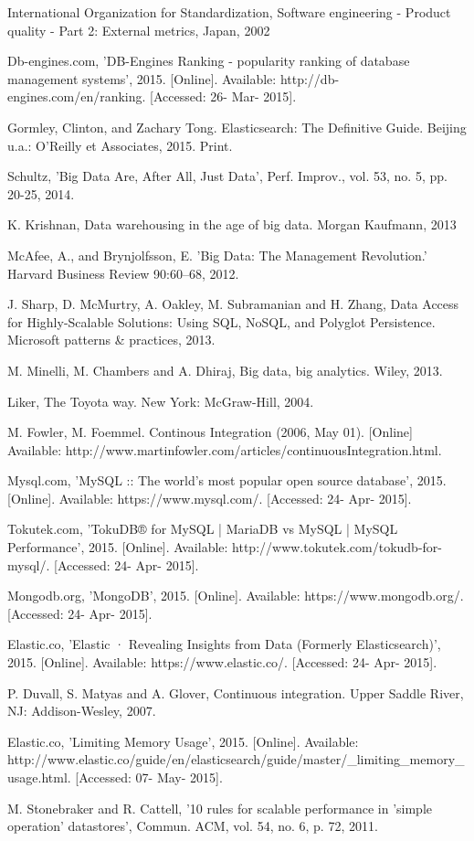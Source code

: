 \begin{thebibliography}{69}
 International Organization for Standardization, Software engineering - Product quality - Part 2: External metrics, Japan, 2002   

 Db-engines.com, 'DB-Engines Ranking - popularity ranking of database management systems', 2015. [Online]. Available: http://db-engines.com/en/ranking. [Accessed: 26- Mar- 2015].

 Gormley, Clinton, and Zachary Tong. Elasticsearch: The Definitive Guide. Beijing u.a.: O'Reilly et Associates, 2015. Print.

 Schultz, 'Big Data Are, After All, Just Data', Perf. Improv., vol. 53, no. 5, pp. 20-25, 2014.

 K. Krishnan, Data warehousing in the age of big data. Morgan Kaufmann, 2013

 McAfee, A., and Brynjolfsson, E. 'Big Data: The Management Revolution.' Harvard Business Review 90:60–68, 2012.

 J.  Sharp, D.  McMurtry, A.  Oakley, M.  Subramanian and H.  Zhang, Data Access for Highly-Scalable Solutions: Using SQL, NoSQL, and Polyglot Persistence. Microsoft patterns \& practices, 2013.

M. Minelli, M. Chambers and A. Dhiraj, Big data, big analytics. Wiley, 2013. 

 Liker, The Toyota way. New York: McGraw-Hill, 2004.

 M. Fowler, M. Foemmel. Continous Integration (2006, May 01). [Online] Available: http://www.martinfowler.com/articles/continuousIntegration.html. 

 Mysql.com, 'MySQL ::  The world's most popular open source database', 2015. [Online]. Available: https://www.mysql.com/. [Accessed: 24- Apr- 2015].

 Tokutek.com, 'TokuDB® for MySQL | MariaDB vs MySQL | MySQL Performance', 2015. [Online]. Available: http://www.tokutek.com/tokudb-for-mysql/. [Accessed: 24- Apr- 2015].

 Mongodb.org, 'MongoDB', 2015. [Online]. Available: https://www.mongodb.org/. [Accessed: 24- Apr- 2015].

 Elastic.co, 'Elastic · Revealing Insights from Data (Formerly Elasticsearch)', 2015. [Online]. Available: https://www.elastic.co/. [Accessed: 24- Apr- 2015].

 P. Duvall, S. Matyas and A. Glover, Continuous integration. Upper Saddle River, NJ: Addison-Wesley, 2007.

 Elastic.co, 'Limiting Memory Usage', 2015. [Online]. Available: http://www.elastic.co/guide/en/elasticsearch/guide/master/\_limiting\_memory\_usage.html. [Accessed: 07- May- 2015].

 M. Stonebraker and R. Cattell, '10 rules for scalable performance in 'simple operation' datastores', Commun. ACM, vol. 54, no. 6, p. 72, 2011. 
\end{thebibliography}
